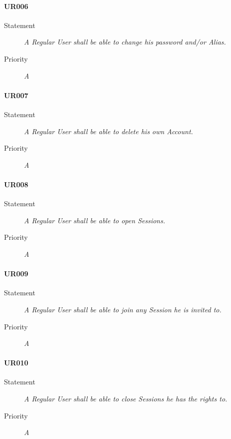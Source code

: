 \paragraph{UR006}
\begin{description}
  \item [Statement] 
    \textit{A \gls{Regular User} shall be able to change his password and/or \gls{Alias}.}
  \item [Priority] \textit{A}
\end{description}

\paragraph{UR007}
\begin{description}
  \item [Statement] 
    \textit{A \gls{Regular User} shall be able to delete his own \gls{Account}.}
  \item [Priority] \textit{A}
\end{description}

\paragraph{UR008}
\begin{description}
  \item [Statement] 
    \textit{A \gls{Regular User} shall be able to open \gls{Session}s.}
  \item [Priority] \textit{A}
\end{description}

\paragraph{UR009}
\begin{description}
  \item [Statement] 
    \textit{A \gls{Regular User} shall be able to join any \gls{Session} he is invited to.}
  \item [Priority] \textit{A}
\end{description}

\paragraph{UR010}
\begin{description}
  \item [Statement] 
    \textit{A \gls{Regular User} shall be able to close \gls{Session}s he has the rights to.}
  \item [Priority] \textit{A}
\end{description}

